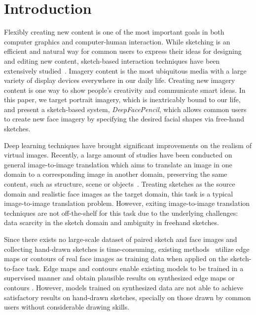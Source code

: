 
\section{Introduction}


Flexibly creating new content is one of the most important goals in both computer graphics and computer-human interaction. While sketching is an efficient and natural way for common users to express their ideas for designing and editing new content, sketch-based interaction techniques have been extensively studied~\cite{SutherlandSketchPad64,Zeleznik-Sketch96,Igarashi-teddy99,Chen_sketchingreality08,Chen09sketch2photo}. 
Imagery content is the most ubiquitous media with a large variety of display devices everywhere in our daily life. 
Creating new imagery content is one way to show people's creativity and communicate smart ideas.
%
In this paper, we target portrait imagery, which is inextricably bound to our life, and present a sketch-based system, \emph{DeepFacePencil}, which allows common users to create new face imagery by specifying the desired facial shapes via free-hand sketches. 

Deep learning techniques have brought significant improvements on the realism of virtual images. 
Recently, a large amount of studies have been conducted on general image-to-image translation which aims to translate an image in one domain to a corresponding image in another domain, preserving the same content, such as structure, scene or objects~\cite{pix2pix,pix2pixHD,CycleGANs,DiscoGANs, DualGANs,BicycleGANs}. 
%
Treating sketches as the source domain and realistic face images as the target domain, this task is a typical image-to-image translation problem.
However, exiting image-to-image translation techniques are not off-the-shelf for this task due to the underlying challenges: data scarcity in the sketch domain and ambiguity in freehand sketches. 


Since there exists no large-scale dataset of paired sketch and face images and collecting hand-drawn sketches is time-consuming, existing methods~\cite{pix2pix, pix2pixHD, Lines2Face} utilize edge maps or contours of real face images as training data when applied on the sketch-to-face task. Edge maps and contours enable existing models to be trained in a supervised manner and obtain plausible results on synthesized edge maps or contours . 
%
However, models trained on synthesized data are not able to achieve satisfactory results on hand-drawn sketches, specially on those drawn by common users without considerable drawing skills. 

